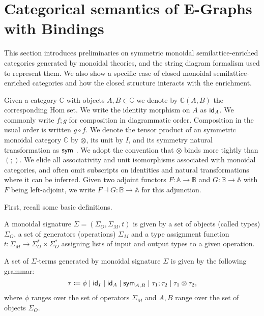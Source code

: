 \section{Categorical semantics of E-Graphs with Bindings}%
\label{sec:categorical}

This section introduces preliminaries on symmetric monoidal semilattice-enriched categories generated by monoidal theories, and the string diagram formalism used to represent them.
We also show a specific case of closed monoidal semilattice-enriched categories and how the closed structure interacts with the enrichment.

Given a category $\mathbb{C}$  with objects $A,B \in \mathbb{C}$ we denote by $\mathbb{C}(A,B)$ the corresponding Hom set.
We write the identity morphism on $A$ as $\textsf{id}_A$.
We commonly write $f;g$ for composition in diagrammatic order.
Composition in the usual order is written $g \circ f$.
We denote the tensor product of an symmetric monoidal category $\mathbb{C}$ by $\otimes$,  its unit by $I$, and its symmetry natural transformation as $\textsf{sym}$ \cite{maclane}.
We adopt the convention that $\otimes$ binds more tightly than $(;\!)$.
We elide all associativity and unit isomorphisms associated with monoidal categories, and often omit subscripts on identities and natural transformations where it can be inferred.
Given two adjoint functors $F\colon \mathbb{A} \to \mathbb{B}$ and $G\colon \mathbb{B} \to \mathbb{A}$ with $F$ being left-adjoint, we write $F \dashv G\colon \mathbb{B} \to \mathbb{A}$ for this adjunction.

First, recall some basic definitions.
\begin{definition}
	A monoidal signature $\Sigma = (\Sigma_{O}, \Sigma_{M}, t)$ is given by a set of objects (called types) $\Sigma_{O}$, a set of generators (operations) $\Sigma_{M}$ and a type assignment function $t\colon \Sigma_{M} \to \Sigma_{O}^{*} \times \Sigma_{O}^{*}$ assigning lists of input and output types to a given operation.
\end{definition}

\begin{definition}
	A set of $\Sigma$-terms generated by monoidal signature $\Sigma$ is given by the following grammar:
	\[
		\tau \coloneqq \phi \;|\; \textsf{id}_{I} \;|\; \textsf{id}_{A} \;|\; \textsf{sym}_{A,B} \;|\; \tau_{1};\tau_{2} \;|\; \tau_{1} \otimes \tau_{2},
	\]
	where $\phi$ ranges over the set of operators $\Sigma_{M}$ and $A,B$ range over the set of objects $\Sigma_{O}$.
\end{definition}

